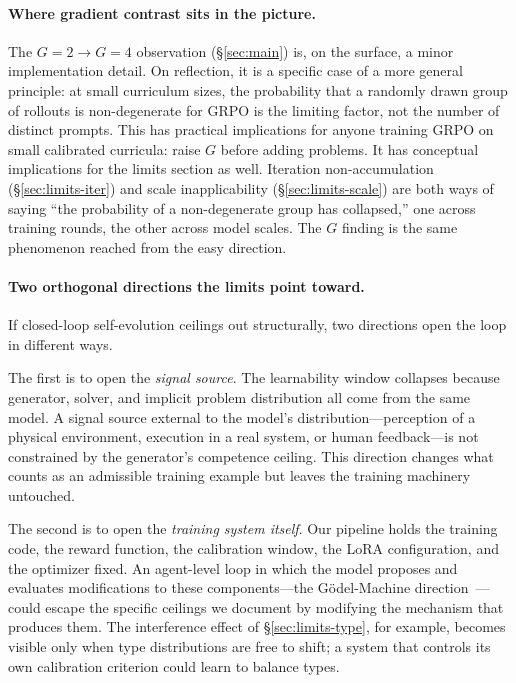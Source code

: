 \documentclass[11pt,a4paper]{article}
\begin{document}
\paragraph{Where gradient contrast sits in the picture.}
The $G = 2 \to G = 4$ observation (\S\ref{sec:main}) is, on the surface, a minor implementation detail.
On reflection, it is a specific case of a more general principle: at small curriculum sizes, the probability that a randomly drawn group of rollouts is non-degenerate for GRPO is the limiting factor, not the number of distinct prompts.
This has practical implications for anyone training GRPO on small calibrated curricula: raise $G$ before adding problems.
It has conceptual implications for the limits section as well.
Iteration non-accumulation (\S\ref{sec:limits-iter}) and scale inapplicability (\S\ref{sec:limits-scale}) are both ways of saying ``the probability of a non-degenerate group has collapsed,'' one across training rounds, the other across model scales.
The $G$ finding is the same phenomenon reached from the easy direction.

\paragraph{Two orthogonal directions the limits point toward.}
If closed-loop self-evolution ceilings out structurally, two directions open the loop in different ways.

The first is to open the \emph{signal source}.
The learnability window collapses because generator, solver, and implicit problem distribution all come from the same model.
A signal source external to the model's distribution---perception of a physical environment, execution in a real system, or human feedback---is not constrained by the generator's competence ceiling.
This direction changes what counts as an admissible training example but leaves the training machinery untouched.

The second is to open the \emph{training system itself}.
Our pipeline holds the training code, the reward function, the calibration window, the LoRA configuration, and the optimizer fixed.
An agent-level loop in which the model proposes and evaluates modifications to these components---the G{\"o}del-Machine direction~\citep{zhang2025dgm,schmidhuber2003godel}---could escape the specific ceilings we document by modifying the mechanism that produces them.
The interference effect of \S\ref{sec:limits-type}, for example, becomes visible only when type distributions are free to shift; a system that controls its own calibration criterion could learn to balance types.
\end{document}
